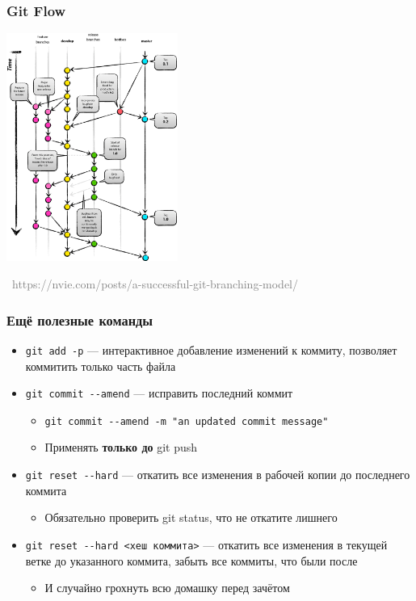 \documentclass[xetex,mathserif,serif]{beamer}
\newcommand{\attribution}[1] {
\vspace{-5mm}\begin{flushright}\begin{scriptsize}\textcolor{gray}{\textcopyright\, #1}\end{scriptsize}\end{flushright}
}
\begin{document}
	\begin{frame}
		\frametitle{Git Flow}
		\begin{center}
			\includegraphics[width=0.42\textwidth]{gitFlow.png}
			\attribution{https://nvie.com/posts/a-successful-git-branching-model/}
		\end{center}
	\end{frame}

	\begin{frame}[fragile]
		\frametitle{Ещё полезные команды}
		\begin{itemize}
			\item \verb|git add -p| --- интерактивное добавление изменений к коммиту, позволяет коммитить только часть файла
			\item \verb|git commit --amend| --- исправить последний коммит
			\begin{itemize}
				\item \verb|git commit --amend -m "an updated commit message"|
				\item Применять \textbf{только до} git push
			\end{itemize}
			\item \verb|git reset --hard| --- откатить все изменения в рабочей копии до последнего коммита
			\begin{itemize}
				\item Обязательно проверить git status, что не откатите лишнего
			\end{itemize}
			\item \verb|git reset --hard <хеш коммита>| --- откатить все изменения в текущей ветке до указанного коммита, забыть все коммиты, что были после
			\begin{itemize}
				\item И случайно грохнуть всю домашку перед зачётом
			\end{itemize}
		\end{itemize}
	\end{frame}
\end{document}
